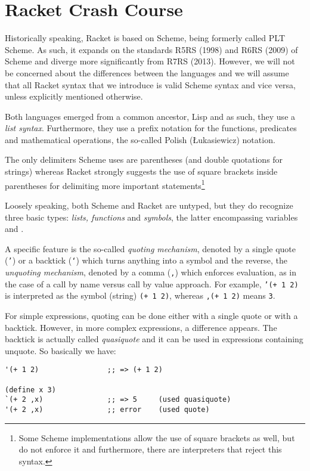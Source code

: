 \chapter{Racket Crash Course}


Historically speaking, Racket is based on Scheme, being formerly called
PLT Scheme. As such, it expands on the standards R5RS (1998) and R6RS (2009)
of Scheme and diverge more significantly from R7RS (2013). However, we will
not be concerned about the differences between the languages and we will
assume that all Racket syntax that we introduce is valid Scheme syntax and
vice versa, unless explicitly mentioned otherwise.

Both languages emerged from a common ancestor, Lisp and as such, they
use a \emph{list syntax}. Furthermore, they use a prefix notation
for the functions, predicates and mathematical operations, the so-called
Polish ({\L}ukasiewicz) notation.

The only delimiters Scheme uses are parentheses (and double quotations
for strings) whereas Racket strongly suggests the use of square brackets
inside parentheses for delimiting more important statements\footnote{Some %
  Scheme implementations allow the use of square brackets as well, but
  do not enforce it and furthermore, there are interpreters that reject
  this syntax.}

Loosely speaking, both Scheme and Racket are untyped, but they do recognize
three basic types: \emph{lists, functions} and \emph{symbols}, the
latter encompassing variables and .

A specific feature is the so-called \emph{quoting mechanism}, denoted
by a single quote (\texttt{'}) or a backtick (\texttt{`}) which
turns anything into a symbol and the reverse, the \emph{unquoting mechanism},
denoted by a comma (\texttt{,}) which enforces evaluation, as in the
case of a call by name versus call by value approach. For example,
\texttt{'(+ 1 2)} is interpreted as the symbol (string) \texttt{(+ 1 2)},
whereas \texttt{,(+ 1 2)} means \texttt{3}.

For simple expressions, quoting can be done either with a single
quote or with a backtick. However, in more complex expressions,
a difference appears. The backtick is actually called
\emph{quasiquote} and it can be used in expressions containing
unquote. So basically we have:
{
  \small
\begin{verbatim}
'(+ 1 2)                ;; => (+ 1 2)

(define x 3)
`(+ 2 ,x)               ;; => 5     (used quasiquote)
'(+ 2 ,x)               ;; error    (used quote)
\end{verbatim}
}

